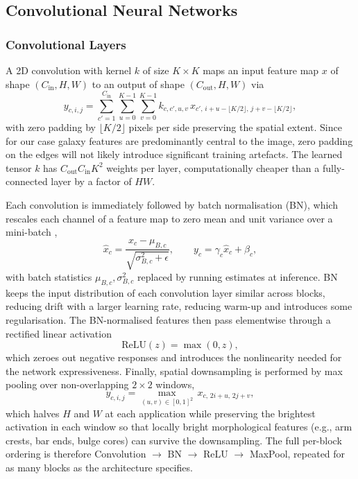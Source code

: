\documentclass[10pt,preprint2]{aastex}
\begin{document}
\subsection{Convolutional Neural Networks}
\label{sec:custom}

\subsubsection{Convolutional Layers}

A 2D convolution with kernel $k$ of size $K \times K$ maps an input feature map $x$ of shape $(C_{\mathrm{in}}, H, W)$ to an output of shape $(C_{\mathrm{out}}, H, W)$ via
\begin{equation}
  y_{c,i,j} = \sum_{c'=1}^{C_{\mathrm{in}}} \sum_{u=0}^{K-1} \sum_{v=0}^{K-1} k_{c,c',u,v}\,x_{c',\,i+u-\lfloor K/2 \rfloor,\,j+v-\lfloor K/2 \rfloor},
  \label{eq:conv}
\end{equation}
with zero padding by $\lfloor K/2 \rfloor$ pixels per side preserving the spatial extent. Since for our case galaxy features are predominantly central to the image, zero padding on the edges will not likely introduce significant training artefacts. The learned tensor $k$ has $C_{\mathrm{out}} C_{\mathrm{in}} K^2$ weights per layer, computationally cheaper than a fully-connected layer by a factor of $HW$.

Each convolution is immediately followed by batch normalisation (BN), which rescales each channel of a feature map to zero mean and unit variance over a mini-batch \citep{IoffeSzegedy2015},
\begin{equation}
  \hat{x}_c = \frac{x_c - \mu_{B,c}}{\sqrt{\sigma^2_{B,c} + \epsilon}}, \qquad y_c = \gamma_c \hat{x}_c + \beta_c,
  \label{eq:batchnorm}
\end{equation}
with batch statistics $\mu_{B,c}, \sigma^2_{B,c}$ replaced by running estimates at inference. BN keeps the input distribution of each convolution layer similar across blocks, reducing drift with a larger learning rate, reducing warm-up and introduces some regularisation. The BN-normalised features then pass elementwise through a rectified linear activation
\begin{equation}
  \mathrm{ReLU}(z) = \max(0, z),
  \label{eq:relu}
\end{equation}
which zeroes out negative responses and introduces the nonlinearity needed for the network expressiveness. Finally, spatial downsampling is performed by max pooling over non-overlapping $2 \times 2$ windows,
\begin{equation}
  y_{c,i,j} = \max_{(u,v) \in [0, 1]^2}\, x_{c,\,2i+u,\,2j+v},
  \label{eq:maxpool}
\end{equation}
which halves $H$ and $W$ at each application while preserving the brightest activation in each window so that locally bright morphological features (e.g., arm crests, bar ends, bulge cores) can survive the downsampling. The full per-block ordering is therefore Convolution $\to$ BN $\to$ ReLU $\to$ MaxPool, repeated for as many blocks as the architecture specifies.
\end{document}
